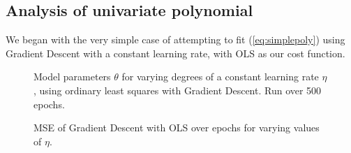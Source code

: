 \documentclass{article}
\theoremstyle{definition}
\begin{document}
\subsection{Analysis of univariate polynomial}
We began with the very simple case of attempting to fit (\ref{eq:simplepoly}) using Gradient Descent with a constant learning rate, with OLS as our cost function.
\begin{figure}[ht]%
    \centering
    \qquad
    \caption{Model parameters $\theta$ for varying degrees of a constant learning rate $\eta$, using ordinary least squares with Gradient Descent. Run over 500 epochs.}%
    \label{fig:GDconstanttheta}%
\end{figure}
\begin{figure}[ht]%
    \centering
    \qquad
    \caption{MSE of Gradient Descent with OLS over epochs for varying values of $\eta$.}%
    \label{fig:GDconstanterror}%
\end{figure}
\end{document}
